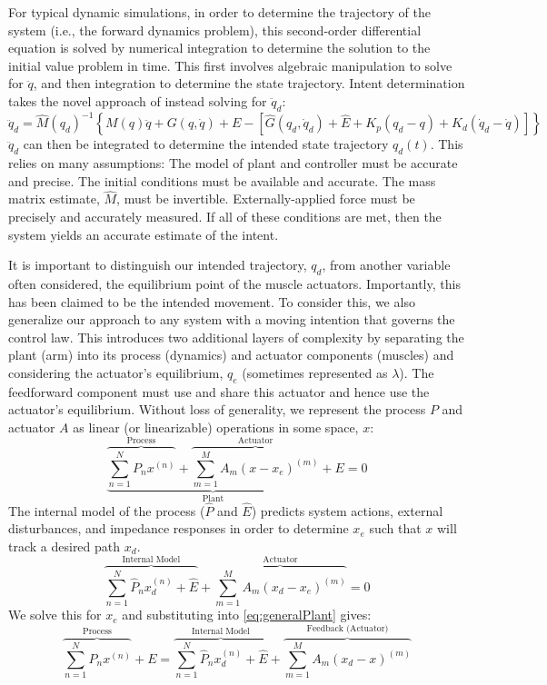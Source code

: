 \documentclass[10pt]{article}
\begin{document}
For typical dynamic simulations, in order to determine the trajectory of the system (i.e., the forward dynamics problem), this second-order differential equation is solved by numerical integration to determine the solution to the initial value problem in time. This first involves algebraic manipulation to solve for $\ddot{q}$, and then integration to determine the state trajectory. Intent determination takes the novel approach of instead solving for $\ddot{q}_d$:
\begin{equation}
\ddot{q}_d=\hat{M}(q_d)^{-1}\left\{M(q)\ddot{q}+G(q,\dot{q})+E-[\hat{G}(q_d,\dot{q}_d)+\hat{E}+K_p(q_d-q)+K_d(\dot{q}_d-\dot{q})]\right\}
\end{equation}  
$\ddot{q}_d$ can then be integrated to determine the intended state trajectory $q_d(t)$. This relies on many assumptions: The model of plant and controller must be accurate and precise. The initial conditions must be available and accurate. The mass matrix estimate, $\hat{M}$, must be invertible. Externally-applied force must be precisely and accurately measured. If all of these conditions are met, then the system yields an accurate estimate of the intent.

It is important to distinguish our intended trajectory, $q_d$, from another variable often considered, the equilibrium point of the muscle actuators. Importantly, this has been claimed to be the intended movement. To consider this, we also generalize our approach to any system with a moving intention that governs the control law. This introduces two additional layers of complexity by separating the plant (arm) into its process (dynamics) and actuator components (muscles) and considering the actuator's equilibrium, $q_e$ (sometimes represented as $\lambda$). The feedforward component must use and share this actuator and hence use the actuator's equilibrium. Without loss of generality, we represent the process $P$ and actuator $A$ as linear (or linearizable) operations in some space, $x$:
\begin{equation} \label{eq:generalPlant}
\underbrace{\overbrace{\sum_{n=1}^N P_nx^{(n)}}^\text{Process}+\overbrace{\sum_{m=1}^M A_m(x-x_e)^{(m)}}^\text{Actuator}}_\text{Plant}+E=0
\end{equation}
The internal model of the process ($\hat{P}$ and $\hat{E}$) predicts system actions, external disturbances, and impedance responses in order to determine $x_e$ such that $x$ will track a desired path $x_d$.    
\begin{equation}
\overbrace{\sum_{n=1}^N \hat{P}_n x^{(n)}_d+\hat{E}}^\text{Internal Model}+\overbrace{\sum_{m=1}^M A_m(x_d-x_e)^{(m)}}^\text{Actuator}=0
\end{equation}
We solve this for $x_e$ and substituting into \eqref{eq:generalPlant} gives:
\begin{equation}
\overbrace{\sum_{n=1}^N P_nx^{(n)}}^\text{Process}+E=\overbrace{\sum_{n=1}^N \hat{P}_n x^{(n)}_d+\hat{E}}^\text{Internal Model}+\overbrace{\sum_{m=1}^M A_m (x_d-x)^{(m)}}^\text{Feedback (Actuator)}
\end{equation}
\end{document}
